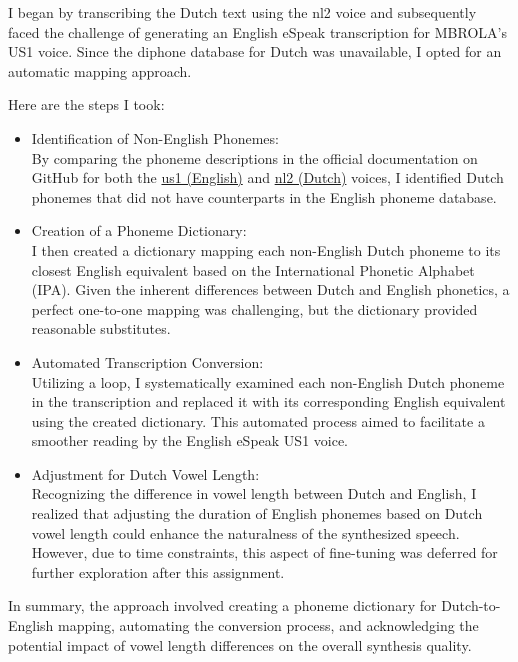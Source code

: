 \documentclass{../labbook}
\begin{document}
\begin{solution}
    I began by transcribing the Dutch text using the nl2 voice and subsequently faced the challenge of generating an English eSpeak transcription for MBROLA's US1 voice. Since the diphone database for Dutch was unavailable, I opted for an automatic mapping approach.

    Here are the steps I took:
    \begin{itemize}
        \item Identification of Non-English Phonemes: \\By comparing the phoneme descriptions in the official documentation on GitHub for both the \href {https://github.com/numediart/MBROLA-voices/tree/master/data/us1} {us1 (English)} and \href {https://github.com/numediart/MBROLA-voices/tree/master/data/nl2} {nl2 (Dutch)} voices, I identified Dutch phonemes that did not have counterparts in the English phoneme database.
        \item Creation of a Phoneme Dictionary: \\I then created a dictionary mapping each non-English Dutch phoneme to its closest English equivalent based on the International Phonetic Alphabet (IPA). Given the inherent differences between Dutch and English phonetics, a perfect one-to-one mapping was challenging, but the dictionary provided reasonable substitutes.
        \item Automated Transcription Conversion: \\Utilizing a loop, I systematically examined each non-English Dutch phoneme in the transcription and replaced it with its corresponding English equivalent using the created dictionary. This automated process aimed to facilitate a smoother reading by the English eSpeak US1 voice.
        \item Adjustment for Dutch Vowel Length: \\Recognizing the difference in vowel length between Dutch and English, I realized that adjusting the duration of English phonemes based on Dutch vowel length could enhance the naturalness of the synthesized speech. However, due to time constraints, this aspect of fine-tuning was deferred for further exploration after this assignment.
    \end{itemize}
    
    In summary, the approach involved creating a phoneme dictionary for Dutch-to-English mapping, automating the conversion process, and acknowledging the potential impact of vowel length differences on the overall synthesis quality.
    
    
\end{solution}
\end{document}
